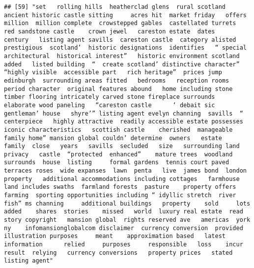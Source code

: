 \documentclass[
]{article}
\begin{document}
\begin{verbatim}
## [59] "set   rolling hills  heatherclad glens  rural scotland  ancient historic castle sitting     acres hit  market friday   offers   million  million complete  crowstepped gables  castellated turrets  red sandstone castle    crown jewel   careston estate  dates    century   listing agent savills  careston castle  category alisted   prestigious  scotland’  historic designations  identifies   “ special architectural  historical interest”   historic environment scotland  added   listed building  “  create scotland’ distinctive character”     “highly visible  accessible part   rich heritage”  prices jump  edinburgh  surrounding areas fitted   bedrooms   reception rooms period character  original features abound   home including stone  timber flooring intricately carved stone fireplace surrounds  elaborate wood paneling   “careston castle      ‘ debait sic   gentleman’ house   shyre’” listing agent evelyn channing  savills  “ centerpiece   highly attractive  readily accessible estate possesses   iconic characteristics   scottish castle    cherished  manageable family home” mansion global couldn’ determine  owners   estate        family  close   years   savills  secluded   size   surrounding land  privacy   castle  “protected  enhanced”    mature trees  woodland  surrounds  house  listing     formal gardens  tennis court paved terraces roses  wide expanses  lawn  penta   live  james bond  london    property   additional accommodations including cottages   farmhouse   land includes swaths  farmland forests  pasture    property offers farming  sporting opportunities including “ idyllic stretch  river  fish” ms channing     additional buildings   property    sold     lots  added    shares  stories    missed   world  luxury real estate  read  story copyright   mansion global  rights reserved ave   americas  york ny    infomansionglobalcom disclaimer  currency conversion  provided  illustration purposes     meant    approximation based   latest information      relied     purposes     responsible   loss    incur   result  relying   currency conversions   property prices   stated   listing agent"                                                                                                                                                                                                                                                                                                                                                                                                                                                                                                                                                                                                                                                                                                                                                                                                                                                                                                                                                                                                                                                                                                                                                                                                                                          
\end{verbatim}
\end{document}
